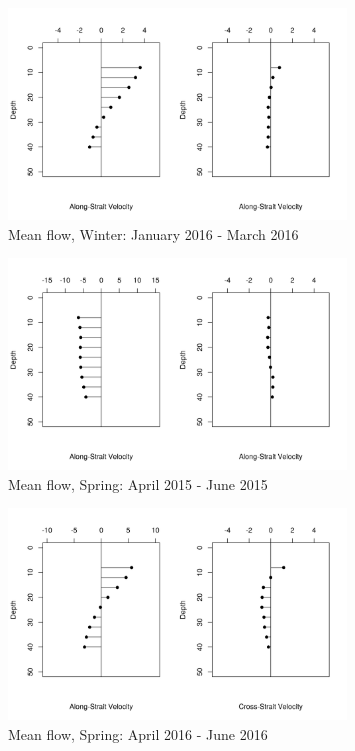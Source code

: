 \documentclass[12pt]{dforeport}
\begin{document}
\begin{figure}  
\centering
\includegraphics[width = 0.8\textwidth]{./figures/43_smf_winter_2016.png}
\caption[Mean flow, Winter, 2016]{Mean flow, Winter: January 2016 - March 2016}
\label{f:smf_w_2016}
\end{figure}


\begin{figure}  
\centering
\includegraphics[width = 0.8\textwidth]{./figures/44_smf_spring_2015.png}
\caption[Mean flow, Spring, 2015]{Mean flow, Spring: April 2015 - June 2015}
\label{f:smf_s_2015}
\end{figure}

\begin{figure}  
\centering
\includegraphics[width = 0.8\textwidth]{./figures/45_smf_spring_2016.png}
\caption[Mean flow, Spring, 2016]{Mean flow, Spring: April 2016 - June 2016}
\label{f:smf_s_2016}
\end{figure}
\end{document}
